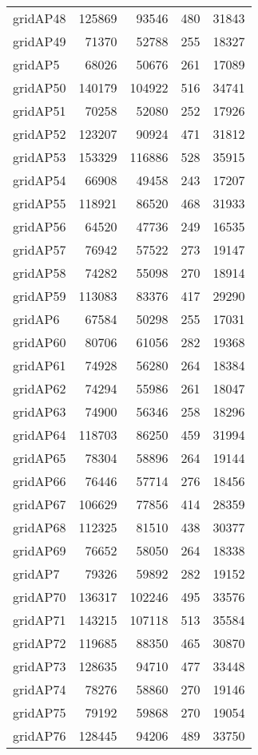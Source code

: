 \begin{tabular}{lrrrr}
gridAP48 & 125869 & 93546 & 480 & 31843 \\
gridAP49 & 71370 & 52788 & 255 & 18327 \\
gridAP5 & 68026 & 50676 & 261 & 17089 \\
gridAP50 & 140179 & 104922 & 516 & 34741 \\
gridAP51 & 70258 & 52080 & 252 & 17926 \\
gridAP52 & 123207 & 90924 & 471 & 31812 \\
gridAP53 & 153329 & 116886 & 528 & 35915 \\
gridAP54 & 66908 & 49458 & 243 & 17207 \\
gridAP55 & 118921 & 86520 & 468 & 31933 \\
gridAP56 & 64520 & 47736 & 249 & 16535 \\
gridAP57 & 76942 & 57522 & 273 & 19147 \\
gridAP58 & 74282 & 55098 & 270 & 18914 \\
gridAP59 & 113083 & 83376 & 417 & 29290 \\
gridAP6 & 67584 & 50298 & 255 & 17031 \\
gridAP60 & 80706 & 61056 & 282 & 19368 \\
gridAP61 & 74928 & 56280 & 264 & 18384 \\
gridAP62 & 74294 & 55986 & 261 & 18047 \\
gridAP63 & 74900 & 56346 & 258 & 18296 \\
gridAP64 & 118703 & 86250 & 459 & 31994 \\
gridAP65 & 78304 & 58896 & 264 & 19144 \\
gridAP66 & 76446 & 57714 & 276 & 18456 \\
gridAP67 & 106629 & 77856 & 414 & 28359 \\
gridAP68 & 112325 & 81510 & 438 & 30377 \\
gridAP69 & 76652 & 58050 & 264 & 18338 \\
gridAP7 & 79326 & 59892 & 282 & 19152 \\
gridAP70 & 136317 & 102246 & 495 & 33576 \\
gridAP71 & 143215 & 107118 & 513 & 35584 \\
gridAP72 & 119685 & 88350 & 465 & 30870 \\
gridAP73 & 128635 & 94710 & 477 & 33448 \\
gridAP74 & 78276 & 58860 & 270 & 19146 \\
gridAP75 & 79192 & 59868 & 270 & 19054 \\
gridAP76 & 128445 & 94206 & 489 & 33750 \\

\end{tabular}
